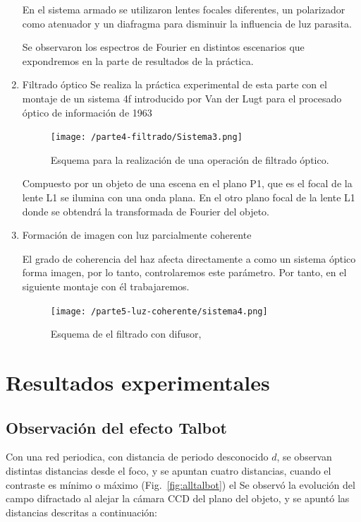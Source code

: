 \documentclass{./packages/optica-article}
\begin{document}
\begin{enumerate}
En el sistema armado se utilizaron lentes focales diferentes, un polarizador como atenuador y un diafragma para disminuir la influencia de luz parasita.

Se observaron los espectros de Fourier en distintos escenarios que expondremos en la parte de resultados de la práctica.
    \item Filtrado óptico
Se realiza la práctica experimental de esta parte con el montaje de un sistema 4f introducido por Van der Lugt para el procesado óptico de información de 1963

\begin{figure}[h]
    \centering
    \texttt{[image: /parte4-filtrado/Sistema3.png]}
    \caption{Esquema para la realización de una operación de filtrado óptico.}
    \label{filtradoopticosistema}
    \end{figure}
    
Compuesto por un objeto de una escena en el plano P1, que es el focal de la lente L1 se ilumina con una onda plana. En el otro plano focal de la lente L1 donde se obtendrá la transformada de Fourier del objeto.

    \item Formación de imagen con luz parcialmente coherente

El grado de coherencia del haz afecta directamente a como un sistema óptico forma imagen, por lo tanto, controlaremos este parámetro. Por tanto, en el siguiente montaje con él trabajaremos.

\begin{figure}[h]
    \centering
    \texttt{[image: /parte5-luz-coherente/sistema4.png]}
    \caption{Esquema de el filtrado con difusor, }
    \label{fig:coherenciaespacial}
\end{figure}

\end{enumerate}

\section{Resultados experimentales}

\subsection{Observación del efecto Talbot}
Con una red periodica, con distancia de periodo desconocido $d$, se observan  distintas distancias desde el foco, y se apuntan cuatro distancias, cuando el contraste es mínimo o máximo (Fig.~\ref{fig:alltalbot}) el Se observó la evolución del campo difractado al alejar la cámara CCD del plano del objeto, y se apuntó las distancias descritas a continuación:
\end{document}
